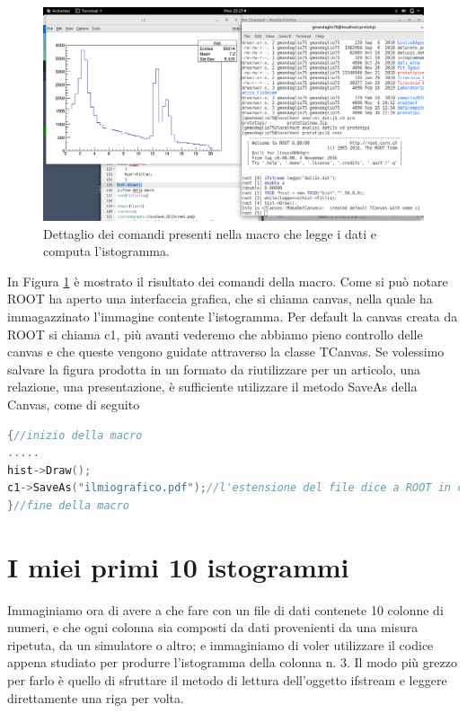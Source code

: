 \documentclass[11pt,fleqn]{book} %
\begin{document}
\begin{figure}
\centering
\includegraphics[scale=0.25]{Pictures/screen1.png}
\caption{Dettaglio dei comandi presenti nella macro che legge i dati e computa l'istogramma. \label{screen1}}
\end{figure}


In Figura  \ref{screen1} è mostrato il risultato dei comandi della macro. Come si può notare ROOT ha aperto una interfaccia grafica, che si chiama canvas, nella quale ha immagazzinato l'immagine contente l'istogramma. Per default la canvas creata da ROOT si chiama c1, più avanti vederemo che abbiamo pieno controllo delle canvas e che queste vengono guidate attraverso la classe TCanvas. 
Se volessimo salvare la figura prodotta in un formato da riutilizzare per un articolo, una relazione, una presentazione, è sufficiente utilizzare il metodo SaveAs della Canvas, come di seguito

\begin{lstlisting}[language=c++]
{//inizio della macro
.....
hist->Draw();
c1->SaveAs("ilmiografico.pdf");//l'estensione del file dice a ROOT in che formato salvare la figura
}//fine della macro
\end{lstlisting}


\section{I miei primi 10 istogrammi}
Immaginiamo ora di avere a che fare con un file di dati contenete 10 colonne di numeri, e che ogni colonna sia composti da dati provenienti da una misura ripetuta, da un simulatore o altro; e immaginiamo di voler utilizzare il codice appena studiato per produrre l'istogramma della colonna n. 3.
Il modo più grezzo per farlo è quello di sfruttare il metodo di lettura dell'oggetto ifstream e leggere direttamente una riga per volta.
\end{document}
